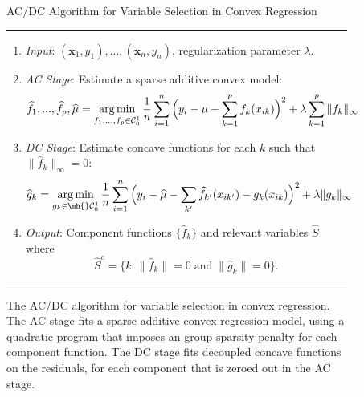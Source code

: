\begin{figure}[t]
{\sc AC/DC Algorithm for Variable Selection in Convex Regression\hfill}
\vskip5pt
\begin{center}
\hrule
\vskip7pt
\normalsize
\begin{enumerate}
\item[] \textit{Input}:  $(\mathbf{x}_1, y_1), ..., (\mathbf{x}_n, y_n)$, regularization parameter $\lambda$.
\vskip5pt
\item[] \textit{AC Stage}:  Estimate a sparse additive convex model:
\begin{equation}
\label{eqn:scam2}
\widehat{f}_1, ..., \widehat{f}_p, \widehat\mu = \mathop{\text{\rm arg\,min}}_{f_1,...,f_p \in \mathcal{C}^1_0} 
   \frac{1}{n} \sum_{i=1}^n \Big(y_i - \mu-\sum_{k=1}^p f_k(x_{ik}) \Big)^2 
       + \lambda \sum_{k=1}^p \| f_k \|_\infty
\end{equation}
\vskip5pt
\item[] \textit{DC Stage}:  Estimate concave functions
 for each $k$ such that $\| \hat{f}_k \|_\infty = 0$:
\begin{equation}
\label{eqn:dc2}
\hat{g}_k = \argmin_{g_k \in \mh{}\C^1_0} 
   \frac{1}{n} \sum_{i=1}^n \Big( y_i - \hat \mu - \sum_{k'} \hat{f}_{k'}(x_{ik'}) 
    - g_k(x_{ik})\Big)^2 
      + \lambda \| g_k \|_\infty
\end{equation}
\item[] \textit{Output}: Component functions $\{\hat f_k\}$ and 
relevant variables $\hat S$ where
\begin{equation}
\hat S^c = \bigl\{k : \| \hat{f}_k \| =
0 \; \mathrm{and}\; \|\hat{g}_k \|=0\bigr\}.
\end{equation}
\end{enumerate}
\vskip3pt
\hrule
\end{center}
\vskip0pt
\caption{The AC/DC algorithm for variable selection in convex
  regression.  The AC stage fits a sparse additive convex regression
  model, using a quadratic program that imposes an group sparsity
  penalty for each component function.  The DC stage fits
  decoupled concave functions on the residuals, for each 
  component that is zeroed out in the AC stage.}
\label{fig:backfitting:algo}
\end{figure}


 
